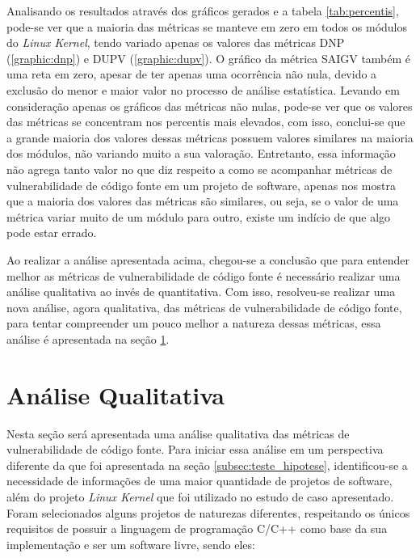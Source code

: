 Analisando os resultados através dos gráficos gerados e a tabela \ref{tab:percentis}, 
pode-se ver que a maioria das métricas se manteve
em zero em todos os módulos do \emph{Linux Kernel}, tendo variado apenas os
valores das métricas DNP (\ref{graphic:dnp}) e DUPV (\ref{graphic:dupv}). O
gráfico da métrica SAIGV também é uma reta em zero, apesar de ter apenas uma ocorrência
não nula, devido a exclusão do menor e maior valor no processo de análise
estatística. Levando em consideração apenas os gráficos das métricas não nulas, 
pode-se ver que os valores das métricas se concentram nos percentis mais elevados, 
com isso, conclui-se que a grande maioria dos valores dessas métricas possuem valores similares na
maioria dos módulos, não variando muito a sua valoração. Entretanto, essa
informação não agrega tanto valor no que diz respeito a como se acompanhar
métricas de vulnerabilidade de código fonte em um projeto de software, apenas nos mostra que a
maioria dos valores das métricas são similares, ou seja, se o valor de uma
métrica variar muito de um módulo para outro, existe um indício de que algo pode
estar errado.

Ao realizar a análise apresentada acima, chegou-se a conclusão que para entender
melhor as métricas de vulnerabilidade de código fonte é necessário realizar uma
análise qualitativa ao invés de quantitativa. Com isso, resolveu-se realizar uma
nova análise, agora qualitativa, das métricas de vulnerabilidade de código fonte, 
para tentar compreender um pouco melhor a natureza dessas métricas, essa análise 
é apresentada na seção \ref{sec:analise_qualitativa}.

\section{Análise Qualitativa} \label{sec:analise_qualitativa}

Nesta seção será apresentada uma análise qualitativa das métricas de vulnerabilidade 
de código fonte. Para iniciar essa análise em um perspectiva diferente da que foi 
apresentada na seção \ref{subsec:teste_hipotese}, identificou-se a necessidade de informações
de uma maior quantidade de projetos de software, além do projeto \emph{Linux Kernel} que foi
utilizado no estudo de caso apresentado. Foram selecionados alguns projetos de naturezas
diferentes, respeitando os únicos requisitos de possuir a linguagem de programação C/C++ como
base da sua implementação e ser um software livre, sendo eles:

